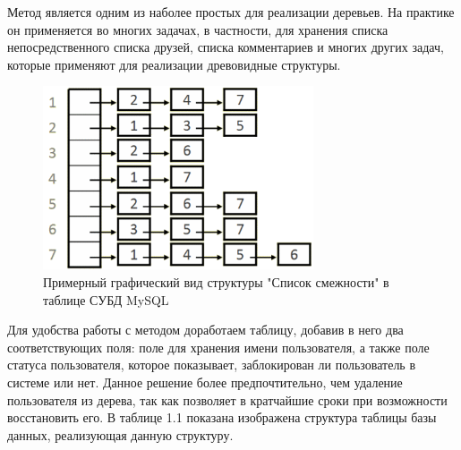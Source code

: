 \documentclass[a4paper,14pt]{extreport}
\theoremstyle{definition}
\begin{document}
Метод является одним из наболее простых для реализации деревьев. На практике он применяется во многих задачах, в частности, для хранения списка непосредственного списка друзей, списка комментариев и многих других задач, которые применяют для реализации древовидные структуры.
\begin{figure}[h!]
\begin{center}
\includegraphics[width=8cm]{11.png}
\caption{Примерный графический вид структуры "Список смежности" в таблице СУБД MySQL}
\label{fig:3}
\end{center}
\end{figure}
Для удобства работы с методом доработаем таблицу, добавив в него два соответствующих поля: поле для хранения имени пользователя, а также поле статуса пользователя, которое показывает, заблокирован ли пользователь в системе или нет. Данное решение более предпочтительно, чем удаление пользователя из дерева, так как позволяет в кратчайшие сроки при возможности восстановить его. В таблице 1.1 показана изображена структура таблицы базы данных, реализующая данную структуру.

\begin{table}[H]
\end{table}
\end{document}
